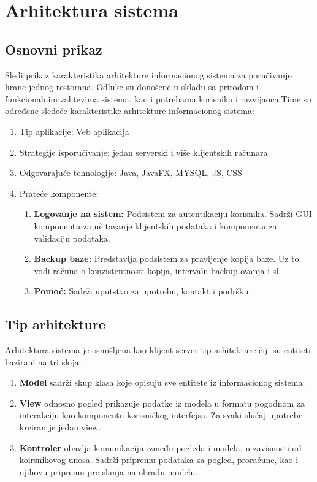 \newpage
\section{Arhitektura sistema}
\subsection{Osnovni prikaz}
Sledi prikaz karakteristika arhitekture informacionog sistema za poručivanje hrane jednog restorana. Odluke su donošene u skladu sa prirodom i funkcionalnim zahtevima sistema, kao i potrebama korisnika i razvijaoca.Time su određene sledeće karakteristike arhitekture informacionog sistema:
\begin{enumerate}
    \item Tip aplikacije: Veb aplikacija
    \item Strategije isporučivanje: jedan serverski i više klijentskih računara
    \item Odgovarajuće tehnologije: Java, JavaFX, MYSQL, JS, CSS
    \item Prateće komponente:
    \begin{enumerate}
        \item \textbf{Logovanje na sistem:} Podsistem za autentikaciju korisnika. Sadrži GUI komponentu za učitavanje klijentskih podataka i komponentu za validaciju podataka.
        \item \textbf{Backup baze:} Predstavlja podsistem za pravljenje kopija baze. Uz to, vodi računa o konzistentnosti kopija, intervalu backup-ovanja i sl.
        \item \textbf{Pomoć:} Sadrži uputstvo za upotrebu, kontakt i podršku.
        
    \end{enumerate}
\end{enumerate}

\subsection{Tip arhitekture}
Arhitektura sistema je osmišljena kao klijent-server tip arhitekture čiji su entiteti bazirani na tri sloja.
\begin{enumerate}
    \item \textbf{Model} sadrži skup klasa koje opisuju sve entitete iz informacionog sistema.
    \item \textbf{View} odnosno pogled prikazuje podatke iz modela u formatu pogodnom za interakciju kao komponentu korisničkog interfejsa. Za svaki slučaj upotrebe kreiran je jedan view.
    \item \textbf{Kontroler} obavlja komunikaciju između pogleda i modela, u zavisnosti od koirsnikovog unosa. Sadrži pripremu podataka za pogled, proračune, kao i njihovu pripremu pre slanja na obradu modelu.
\end{enumerate}
